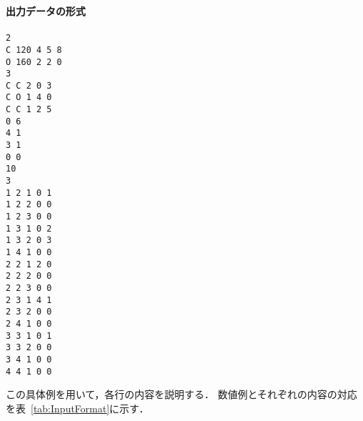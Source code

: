 \documentclass[11pt,titlepage,dvipdfmx,twoside]{jarticle}
\begin{document}
\begin{oframed}
{\bf 出力データの形式}\\\\
{\tt 2\\
C 120 4 5 8\\
O 160 2 2 0\\
3\\
C C 2 0 3\\
C O 1 4 0\\
C C 1 2 5\\
0 6\\
4 1\\
3 1\\
0 0\\
10\\
3\\
1 2 1 0 1\\
1 2 2 0 0\\
1 2 3 0 0\\
1 3 1 0 2\\
1 3 2 0 3\\
1 4 1 0 0\\
2 2 1 2 0\\
2 2 2 0 0\\
2 2 3 0 0\\
2 3 1 4 1\\
2 3 2 0 0\\
2 4 1 0 0\\
3 3 1 0 1\\
3 3 2 0 0\\
3 4 1 0 0\\
4 4 1 0 0\\}
\end{oframed}


この具体例を用いて，各行の内容を説明する．
数値例とそれぞれの内容の対応を表~\ref{tab:InputFormat}に示す．
\end{document}
